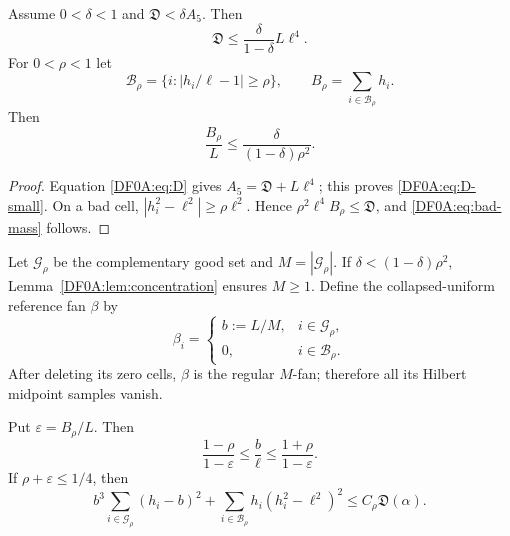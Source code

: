 \begin{lemma}
\label{DF0A:lem:concentration}
Assume $0<\delta<1$ and
$\mathfrak D<\delta A_5$.  Then
\begin{equation}\label{DF0A:eq:D-small}
 \mathfrak D\le\frac{\delta}{1-\delta}L\ell^4.
\end{equation}
For $0<\rho<1$ let
\begin{equation}\label{DF0A:eq:bad}
 \mathcal B_\rho=\{i:|h_i/\ell-1|\ge\rho\},
 \qquad B_\rho=\sum_{i\in\mathcal B_\rho}h_i.
\end{equation}
Then
\begin{equation}\label{DF0A:eq:bad-mass}
 \boxed{
 \frac{B_\rho}{L}
 \le\frac{\delta}{(1-\delta)\rho^2}.}
\end{equation}
\end{lemma}

\begin{proof}
Equation \eqref{DF0A:eq:D} gives $A_5=\mathfrak D+L\ell^4$;
this proves \eqref{DF0A:eq:D-small}.  On a bad cell,
$|h_i^2-\ell^2|\ge\rho\ell^2$.  Hence
$\rho^2\ell^4B_\rho\le\mathfrak D$, and
\eqref{DF0A:eq:bad-mass} follows.
\end{proof}

Let $\mathcal G_\rho$ be the complementary good set and
$M=|\mathcal G_\rho|$.  If
$\delta<(1-\delta)\rho^2$, Lemma~\ref{DF0A:lem:concentration} ensures
$M\ge1$.  Define the collapsed-uniform reference fan $\beta$ by
\begin{equation}\label{DF0A:eq:beta}
 \beta_i=\begin{cases}b:=L/M,&i\in\mathcal G_\rho,\\0,&i\in\mathcal B_\rho.
 \end{cases}
\end{equation}
After deleting its zero cells, $\beta$ is the regular $M$-fan; therefore
all its Hilbert midpoint samples vanish.

\begin{lemma}
\label{DF0A:lem:reference}
Put $\varepsilon=B_\rho/L$.  Then
\begin{equation}\label{DF0A:eq:b-ell}
 \frac{1-\rho}{1-\varepsilon}
 \le\frac b\ell\le
 \frac{1+\rho}{1-\varepsilon}.
\end{equation}
If $\rho+\varepsilon\le1/4$, then
\begin{equation}\label{DF0A:eq:reference-charge}
 \boxed{
 b^3\sum_{i\in\mathcal G_\rho}(h_i-b)^2
 +\sum_{i\in\mathcal B_\rho}h_i(h_i^2-\ell^2)^2
 \le C_\rho\mathfrak D(\alpha).}
\end{equation}
\end{lemma}

